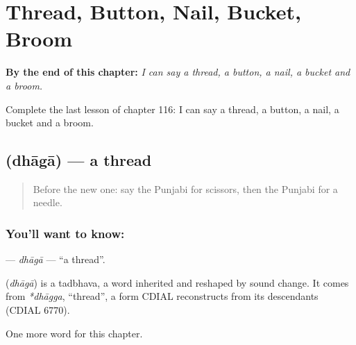 
\chapter{Thread, Button, Nail, Bucket, Broom}
\label{ch:pa-thread-button-nail-bucket-broom}

\begin{chapteropening}
\textbf{By the end of this chapter:} \emph{I can say a thread, a button, a nail, a bucket and a broom.}

Complete the last lesson of chapter 116: I can say a thread, a button, a nail, a bucket and a broom.
\end{chapteropening}

\section[\texorpdfstring{\pa{ਧਾਗਾ} (dhāgā)}{ਧਾਗਾ (dhāgā)}]{ (dhāgā) — a thread}

\label{lesson:PA-C116-dhaga}



\begin{quote}
Before the new one: say the Punjabi for scissors, then the Punjabi for a needle.
\end{quote}

\subsection*{You'll want to know: }
\textbf{} — \emph{dhāgā} — \textquotedblleft{}a thread\textquotedblright{}.

\begin{cousinweb}
\textbf{} (\emph{dhāgā}) is a tadbhava, a word inherited and reshaped by sound change. It comes from \emph{*dhāgga}, \textquotedblleft{}thread\textquotedblright{}, a form CDIAL reconstructs from its descendants (CDIAL 6770).
\end{cousinweb}

\begin{grammarlens}[title={What you've built}]
One more word for this chapter.
\end{grammarlens}

